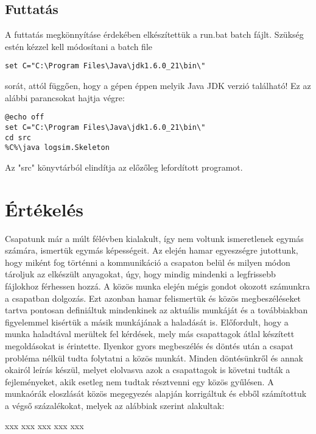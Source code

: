 \subsection{Futtatás}
A futtatás megkönnyításe érdekében elkészítettük a run.bat batch fájlt.
Szükség estén kézzel kell módosítani a batch file 
\begin{verbatim}
set C="C:\Program Files\Java\jdk1.6.0_21\bin\" 
\end{verbatim} sorát, attól függően, hogy a gépen éppen melyik Java JDK verzió található!
Ez az alábbi parancsokat hajtja végre:
\lstset{escapeinside=`', xleftmargin=10pt, frame=single, basicstyle=\ttfamily\footnotesize, language=sh}
\begin{lstlisting}
@echo off
set C="C:\Program Files\Java\jdk1.6.0_21\bin\"
cd src
%C%\java logsim.Skeleton
\end{lstlisting}
Az "src" könyvtárból elindítja az előzőleg lefordított programot.


\section{Értékelés}

Csapatunk már a múlt félévben kialakult, így nem voltunk ismeretlenek egymás számára, ismertük egymás képességeit. Az elején hamar egyeszségre jutottunk, hogy miként fog történni a kommunikáció a csapaton belül és milyen módon tároljuk az elkészült anyagokat, úgy, hogy mindig mindenki a legfrissebb fájlokhoz férhessen hozzá. 
A közös munka elején mégis gondot okozott számunkra a csapatban dolgozás. Ezt azonban hamar felismertük és közös megbeszéléseket tartva pontosan definiáltuk mindenkinek az aktuális munkáját és a továbbiakban figyelemmel kisértük a másik munkájának a haladását is. Előfordult, hogy a munka haladtával merültek fel kérdések, mely más csapattagok átlal készített megoldásokat is érintette. Ilyenkor gyors megbeszélés és döntés után a csapat probléma nélkül tudta folytatni a közös munkát. Minden döntésünkről és annak okairól leírás készül, melyet elolvasva azok a csapattagok is követni tudták a fejleményeket, akik esetleg nem tudtak résztvenni egy közös gyűlésen.
A munkaórák eloszlását közös megegyezés alapján korrigáltuk és ebből számítottuk a végső százalékokat, melyek az alábbiak szerint alakultak:

\begin{ertekeles}
{xxx}        %
{xxx}
{xxx}
{xxx}
{xxx}
\end{ertekeles}

